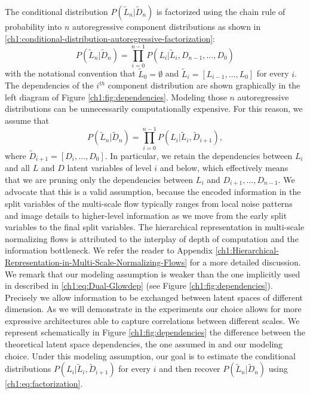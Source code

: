The conditional distribution $P(\tilde{L}_n| \tilde{D}_n)$ is factorized using the chain rule of probability into $n$ autoregressive component distributions as shown in \eqref{ch1:conditional-distribution-autoregressive-factorization}:
\begin{equation}\label{ch1:conditional-distribution-autoregressive-factorization}
    P(\tilde{L}_n| \tilde{D}_n) = \prod_{i=0}^{n-1}P(L_i|\tilde{L}_{i},D_{n-1},...,D_0)
\end{equation}
with the notational convention that $\tilde{L}_{0}=\emptyset$ and $\tilde L_{i} = [L_{i-1}, \ldots, L_0]$ for every $i$. The dependencies of the $i^{th}$ component distribution are shown graphically in the left diagram of Figure \ref{ch1:fig:dependencies}. Modeling those $n$ autoregressive distributions can be unnecessarily computationally expensive. For this reason, we assume that 
\begin{equation}\label{ch1:eq:factorization}
    P(\tilde{L}_n| \tilde{D}_n)= \prod_{i=0}^{n-1}P(L_i|\tilde{L}_{i},\tilde D_{i+1}),
\end{equation}
where $\tilde D_{i+1} = [D_{i}, \ldots, D_0]$. In particular, we retain the dependencies between $L_{i}$ and all $L$ and $D$ latent variables of level $i$ and below, which effectively means that we are pruning only the dependencies between  $L_{i}$ and $D_{i+1},...,D_{n-1}$. We advocate that this is a valid assumption, because the encoded information in the split variables of the multi-scale flow typically ranges from local noise patterns and image details to higher-level information as we move from the early split variables to the final split variables.  The hierarchical representation in multi-scale normalizing flows is attributed to the interplay of depth of computation and the information bottleneck. We refer the reader to Appendix \ref{ch1:Hierarchical-Representation-in-Multi-Scale-Normalizing-Flows} for a more detailed discussion. \\ \color{black}
We remark that our modeling assumption is weaker than the one implicitly used in \cite{Dual-Glow} described in \eqref{ch1:eq:Dual-Glowdep} (see Figure \ref{ch1:fig:dependencies}). Precisely we allow information to be exchanged between latent spaces of different dimension. As we will demonstrate in the experiments our choice allows for more expressive architectures able to capture correlations between different scales.
We represent schematically in Figure \ref{ch1:fig:dependencies} the difference between the theoretical latent space dependencies, the one assumed in \cite{Dual-Glow} and our modeling choice. 
Under this modeling assumption, our goal is to estimate the conditional distributions $P(L_i|\tilde{L}_{i},\tilde D_{i+1})$ for every $i$ and then recover 
$P(\tilde{L}_n| \tilde{D}_n)$ using \eqref{ch1:eq:factorization}.

